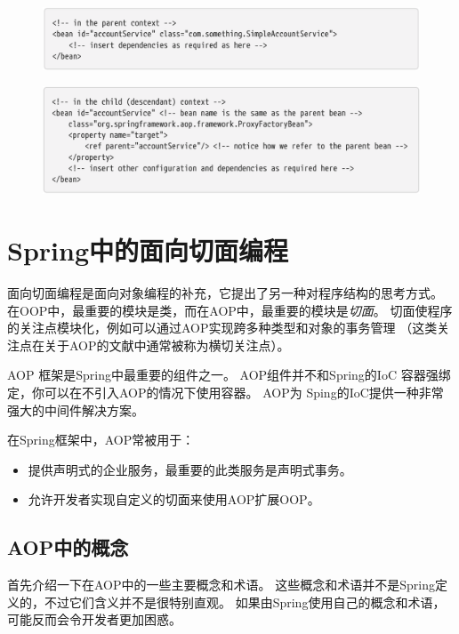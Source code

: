 \begin{figure}[ht]
    \centering
    \includegraphics[width=1\linewidth]{./Figure/IMG_code_38.png}
\end{figure}

\begin{figure}[ht]
    \centering
    \includegraphics[width=1\linewidth]{./Figure/IMG_code_39.png}
\end{figure}

\chapter{Spring中的面向切面编程}
面向切面编程是面向对象编程的补充，它提出了另一种对程序结构的思考方式。
在OOP中，最重要的模块是类，而在AOP中，最重要的模块是\textit{切面}。
切面使程序的关注点模块化，例如可以通过AOP实现跨多种类型和对象的事务管理
（这类关注点在关于AOP的文献中通常被称为横切关注点）。

AOP 框架是Spring中最重要的组件之一。
AOP组件并不和Spring的IoC 容器强绑定，你可以在不引入AOP的情况下使用容器。
AOP为 Sping的IoC提供一种非常强大的中间件解决方案。

在Spring框架中，AOP常被用于：

\begin{itemize}
    \item 提供声明式的企业服务，最重要的此类服务是声明式事务。
    \item 允许开发者实现自定义的切面来使用AOP扩展OOP。
\end{itemize}

\section{AOP中的概念}
首先介绍一下在AOP中的一些主要概念和术语。
这些概念和术语并不是Spring定义的，不过它们含义并不是很特别直观。
如果由Spring使用自己的概念和术语，可能反而会令开发者更加困惑。

